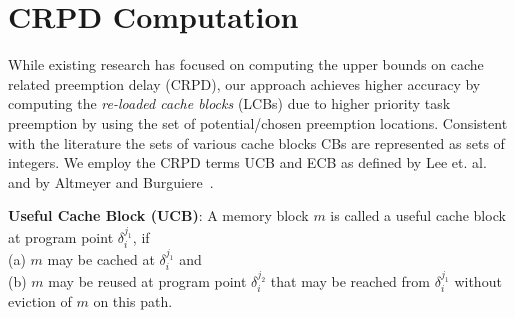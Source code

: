 \section{CRPD Computation}\label{sec:crpd_computation}

While existing research has focused on computing the upper bounds on cache related preemption delay (CRPD), our approach achieves higher accuracy by computing the \emph{re-loaded cache blocks} (LCBs) due to higher priority task preemption by using the set of potential/chosen preemption locations.  Consistent with the literature the sets of various cache blocks CBs are represented as sets of integers.  We employ the CRPD terms UCB and ECB as defined by Lee et. al.~\cite{lee:98} and by Altmeyer and Burguiere~\cite{altmeyer:11c}.

\begin{definition}
\textbf{Useful Cache Block (UCB)}: A memory block $m$ is called a useful cache block at program point \begin{math}\delta_{i}^{j_{1}}\end{math}, if \\(a) $m$ may be cached at \begin{math}\delta_{i}^{j_{1}}\end{math} and \\(b) $m$ may be reused at program point \begin{math}\delta_{i}^{j_{2}}\end{math} that may be reached from \begin{math}\delta_{i}^{j_{1}}\end{math} without eviction of $m$ on this path.
\end{definition}

